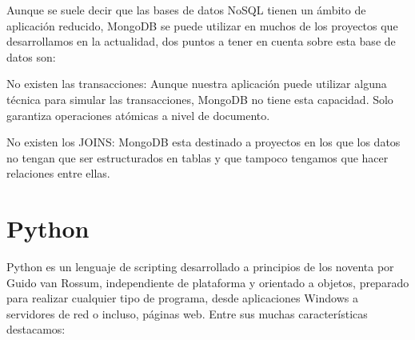 \documentclass[a4paper, 12pt]{book}
\begin{document}
	Aunque se suele decir que las bases de datos NoSQL tienen un ámbito de aplicación reducido, MongoDB se puede utilizar en muchos de los proyectos que desarrollamos en la actualidad, dos puntos a tener en cuenta sobre esta base de datos son:
	
	No existen las transacciones: Aunque nuestra aplicación puede utilizar alguna técnica para simular las transacciones, MongoDB no tiene esta capacidad. Solo garantiza operaciones atómicas a nivel de documento.

	No existen los JOINS: MongoDB esta destinado a proyectos en los que los datos no tengan que  ser estructurados en tablas y que tampoco tengamos que hacer relaciones entre ellas.


\section{Python} 
\label{sec:Python}
Python es un lenguaje de scripting desarrollado a principios de los noventa por Guido van Rossum, independiente de plataforma y orientado a objetos, preparado para realizar cualquier tipo de programa, desde aplicaciones Windows a servidores de red o incluso, páginas web. Entre sus muchas características destacamos:
\end{document}
